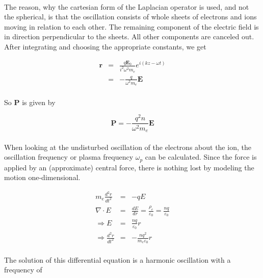 \documentclass[a4paper,10pt]{thesis}
\begin{document}
\paragraph*{}
The reason, why the cartesian form of the Laplacian operator is used, and not the spherical, is that the oscillation consists of whole sheets of electrons and ions moving in relation to each other. The remaining component of the electric field is in direction perpendicular to the sheets. All other components are canceled out. After integrating and choosing the appropriate constants, we get

\begin{eqnarray}
    \mathbf{r}&=&\frac{q \mathbf{E}_0}{i^2 \omega^2 m_e} e^{i(kz-\omega t)}\label{solution_for_r} \\
    &=&-\frac{q }{ \omega^2 m_e} \mathbf{E}
\end{eqnarray}

\paragraph*{}
So \textbf{P} is given by

\begin{equation}\label{polarization_solution}
    \mathbf{P}=-\frac{q^2 n }{ \omega^2 m_e} \mathbf{E}
\end{equation}

\paragraph*{}
When looking at the undisturbed oscillation of the electrons about the ion, the oscillation frequency or plasma frequency $\omega_p$ can be calculated. Since the force is applied by an (approximate) central force, there is nothing lost by modeling the motion one-dimensional.

\begin{eqnarray}
  m_e\frac{d^2r}{dt^2} &=& -qE\\
  \nabla \cdot E &=& \frac{dE}{dr}=\frac{\rho_e}{\varepsilon_0}=\frac{nq}{\varepsilon_0}\\
  \Rightarrow E&=&\frac{nq}{\varepsilon_0}r\\
  \Rightarrow \frac{d^2r}{dt^2} &=&-\frac{nq^2}{m_e\varepsilon_0}r
\end{eqnarray}

\paragraph*{}
The solution of this differential equation is a harmonic oscillation with a frequency of
\end{document}
